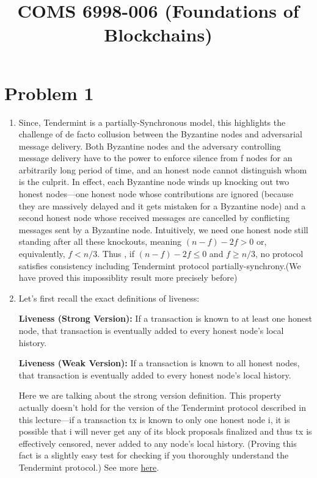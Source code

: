 \documentclass{article}
\title{COMS 6998-006 (Foundations of Blockchains) \par \exerciseset}
\author{\FirstAuther \qquad  \SecondAuther}
\begin{document}
\maketitle

\section*{Problem 1}
\begin{enumerate}
    \item 
    Since, Tendermint is a partially-Synchronous model,
    this highlights the challenge of de facto collusion between the Byzantine
nodes and adversarial message delivery. Both Byzantine nodes and the adversary controlling
message delivery have to the power to enforce silence from f nodes for an arbitrarily long
period of time, and an honest node cannot distinguish whom is the culprit. In effect, each
Byzantine node winds up knocking out two honest nodes—one honest node whose contributions are ignored (because they are massively delayed and it gets mistaken for a Byzantine
node) and a second honest node whose received messages are cancelled by conflicting messages sent by a Byzantine node. Intuitively, we need one honest node still standing after all
these knockouts, meaning $(n − f) − 2f > 0$ or, equivalently, $f < n/3$.    
Thus , if $(n − f) − 2f \leq 0$ and $f \geq n/3$, no  protocol satisfies consistency including Tendermint protocol partially-synchrony.(We have proved this impossiblity result more precisely before)
    \item
    Let's first recall the exact definitions of liveness:
    
    \textbf{Liveness (Strong Version):} If a transaction is known to at least one honest node, that transaction is eventually added to every honest node’s local history.
    
    \textbf{Liveness (Weak Version):} If a transaction is known to all honest nodes, that transaction is eventually added to every honest node’s local history. 
    
    Here we are talking about the strong version definition.
    This property actually doesn’t hold for the version of the Tendermint protocol described in
this lecture—if a transaction tx is known to only one honest node i, it is possible that i
will never get any of its block proposals finalized and thus tx is effectively censored, never added to any node’s local history. (Proving this fact is a slightly easy test for checking if you
thoroughly understand the Tendermint protocol.) See more \href{https://timroughgarden.github.io/fob21/l/l7.pdf}{here}.
\end{enumerate}
\end{document}
